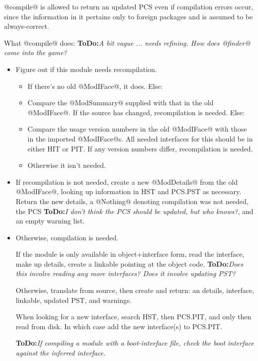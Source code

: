 \documentclass[11pt]{article}
\newcommand{\ToDo}[1]{{{\bf ToDo:}\sl #1}}
\begin{document}
@compile@ is allowed to return an updated PCS even if compilation
errors occur, since the information in it pertains only to foreign
packages and is assumed to be always-correct.

What @compile@ does: \ToDo{A bit vague ... needs refining.  How does
                           @finder@ come into the game?}
\begin{itemize}
\item Figure out if this module needs recompilation.
   \begin{itemize}
   \item If there's no old @ModIFace@, it does.  Else:
   \item Compare the @ModSummary@ supplied with that in the
         old @ModIFace@.  If the source has changed, recompilation
         is needed.  Else:
   \item Compare the usage version numbers in the old @ModIFace@ with
         those in the imported @ModIFace@s.  All needed interfaces
         for this should be in either HIT or PIT.  If any version
         numbers differ, recompilation is needed.
   \item Otherwise it isn't needed.   
   \end{itemize}

\item
   If recompilation is not needed, create a new @ModDetails@ from the
   old @ModIFace@, looking up information in HST and PCS.PST as
   necessary.  Return the new details, a @Nothing@ denoting
   compilation was not needed, the PCS \ToDo{I don't think the PCS
   should be updated, but who knows?}, and an empty warning list.

\item
   Otherwise, compilation is needed.  

   If the module is only available in object+interface form, read the
   interface, make up details, create a linkable pointing at the
   object code.  \ToDo{Does this involve reading any more interfaces?  Does
   it involve updating PST?}
   
   Otherwise, translate from source, then create and return: an
   details, interface, linkable, updated PST, and warnings.

   When looking for a new interface, search HST, then PCS.PIT, and only
   then read from disk.  In which case add the new interface(s) to
   PCS.PIT.  
   
   \ToDo{If compiling a module with a boot-interface file, check the 
   boot interface against the inferred interface.}
\end{itemize}
\end{document}
